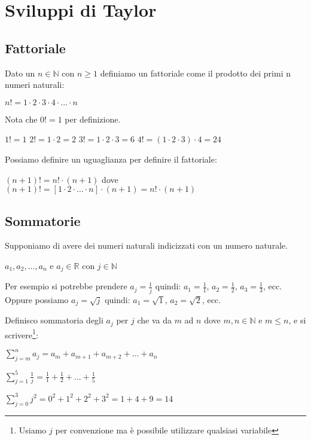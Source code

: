 \newpage
\section{Sviluppi di Taylor}

\subsection{Fattoriale}
\begin{definition}[Fattoriale]
Dato un $n \in \mathbb{N}$ con $n \geq 1$ definiamo un fattoriale come il prodotto dei primi n numeri naturali:
\begin{center}
    $n! = 1 \cdot 2 \cdot 3 \cdot 4 \cdot ... \cdot n$
\end{center}
\end{definition}
\begin{note}
Nota che $0! = 1$ per definizione.
\end{note}
\begin{example}
$1! = 1$ \hspace{.5cm} $2! = 1 \cdot 2 = 2$ \hspace{.5cm} $3! = 1 \cdot 2 \cdot 3 = 6$ \hspace{.5cm} $4! = (1 \cdot 2 \cdot 3) \cdot 4 = 24$
\end{example}
\hspace{-15pt}Possiamo definire un uguaglianza per definire il fattoriale:
\begin{center}
    $(n+1)! = n! \cdot (n+1)$ dove $(n+1)! = [1 \cdot 2 \cdot ... \cdot n] \cdot (n+1) = n! \cdot (n+1)$
\end{center}

\subsection{Sommatorie}
Supponiamo di avere dei numeri naturali indicizzati con un numero naturale.
\begin{center}
    $a_1, a_2, ..., a_n$ e $a_j \in \mathbb{R}$ con $j \in \mathbb{N}$
\end{center}
Per esempio si potrebbe prendere $a_j = \frac{1}{j}$ quindi: $a_1 = \frac{1}{1}$, $a_2 = \frac{1}{2}$, $a_3 = \frac{1}{3}$, ecc.
Oppure possiamo $a_j = \sqrt{j}$ quindi: $a_1 = \sqrt{1}$, $a_2 = \sqrt{2}$, ecc.

\begin{definition}[Sommatoria]
Definisco sommatoria degli $a_j$ per $j$ che va da $m$ ad $n$ dove $m,n \in \mathbb{N}$ e $m \leq n$, e si scrivere\footnote{Usiamo $j$ per convenzione ma è possibile utilizzare qualsiasi variabile}:
\begin{center}\vspace{-5pt}
    $\sum\limits_{j = m}^n a_j = a_m + a_{m+1} + a_{m+2} + ... + a_n$
\end{center}
\end{definition}
\begin{example}
$\sum\limits_{j = 1}^5 \frac{1}{j} = \frac{1}{1} + \frac{1}{2} + ... + \frac{1}{5}$
\end{example}
\begin{example}
$\sum\limits_{j = 0}^3 j^2 = 0^2 + 1^2 + 2^2 + 3^2 = 1 + 4 + 9 = 14$
\end{example}

